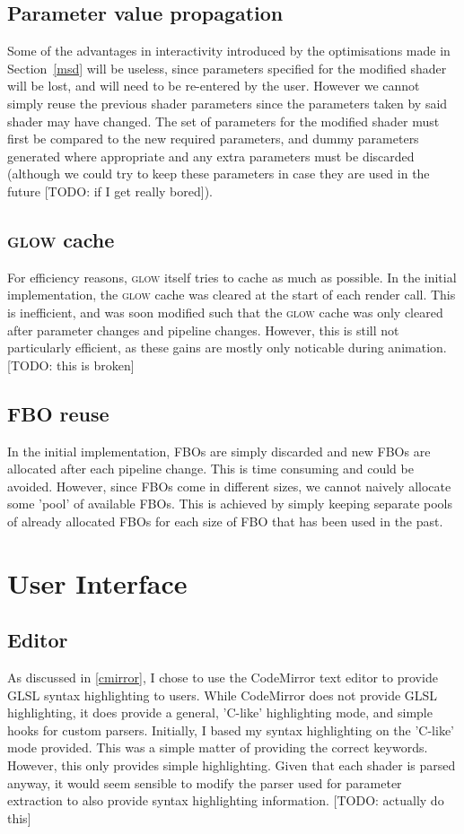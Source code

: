 \documentclass[12pt,twoside,notitlepage]{report}
\begin{document}
\subsection{Parameter value propagation}
Some of the advantages in interactivity introduced by the optimisations made in Section~\ref{msd} will be useless, since parameters specified for the modified shader will be lost, and will need to be re-entered by the user. However we cannot simply reuse the previous shader parameters since the parameters taken by said shader may have changed. The set of parameters for the modified shader must first be compared to the new required parameters, and dummy parameters generated where appropriate and any extra parameters must be discarded (although we could try to keep these parameters in case they are used in the future [TODO: if I get really bored]). 

\subsection{\textsc{glow} cache}
\label{glow-cache}
For efficiency reasons, \textsc{glow} itself tries to cache as much as possible. In the initial implementation, the \textsc{glow} cache was cleared at the start of each render call. This is inefficient, and was soon modified such that the \textsc{glow} cache was only cleared after parameter changes and pipeline changes. However, this is still not particularly efficient, as these gains are mostly only noticable during animation. 
[TODO: this is broken]

\subsection{FBO reuse}
In the initial implementation, FBOs are simply discarded and new FBOs are allocated after each pipeline change. This is time consuming and could be avoided. However, since FBOs come in different sizes, we cannot naively allocate some 'pool' of available FBOs. This is achieved by simply keeping separate pools of already allocated FBOs for each size of FBO that has been used in the past.

\section{User Interface}
\subsection{Editor}
As discussed in \ref{cmirror}, I chose to use the CodeMirror text editor to provide GLSL syntax highlighting to users. While CodeMirror does not provide GLSL highlighting, it does provide a general, 'C-like' highlighting mode, and simple hooks for custom parsers. Initially, I based my syntax highlighting on the 'C-like' mode provided. This was a simple matter of providing the correct keywords. However, this only provides simple highlighting. Given that each shader is parsed anyway, it would seem sensible to modify the parser used for parameter extraction to also provide syntax highlighting information. [TODO: actually do this]
\end{document}
